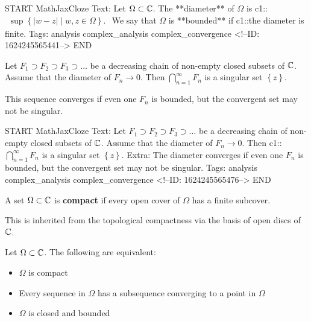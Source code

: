\documentclass{memoir}
\begin{document}
\begin{anki}
START
MathJaxCloze
Text: Let \(\Omega\subset \mathbb{C}\). The **diameter** of \(\Omega\) is
 {{c1::\(\begin{align*}
         	\sup \left\{\left| w-z \right|  \mid w,z \in \Omega \right\} .
         \end{align*}\)}} 
We say that \(\Omega\) is **bounded** if {{c1::the diameter is finite}}.
Tags: analysis complex_analysis complex_convergence
<!--ID: 1624245565441-->
END
\end{anki}

\begin{thm}
	Let \(F_1 \supset F_2 \supset F_3 \supset \ldots\) be a decreasing chain of non-empty closed subsets of \(\mathbb{C}\). Assume that the diameter of \(F_n\to 0\). Then \(\bigcap_{n=1}^{\infty}F_n\) is a singular set \(\left\{ z \right\} \).
\end{thm}
This sequence converges if even one \(F_n\) is bounded, but the convergent set may not be singular.

\begin{anki}
START
MathJaxCloze
Text: Let \(F_1 \supset F_2 \supset F_3 \supset \ldots\) be a decreasing chain of non-empty closed subsets of \(\mathbb{C}\). Assume that the diameter of \(F_n\to 0\). Then {{c1::\(\bigcap_{n=1}^{\infty}F_n\) is a singular set \(\left\{ z \right\} \)}}.
Extra: The diameter converges if even one \(F_n\) is bounded, but the convergent set may not be singular.
Tags: analysis complex_analysis complex_convergence
<!--ID: 1624245565476-->
END
\end{anki}

\begin{defn}[Compactness]
	A set \(\Omega\subset \mathbb{C}\) is \textbf{compact} if every open cover of \(\Omega\) has a finite subcover.
\end{defn}

This is inherited from the topological compactness via the basis of open discs of \(\mathbb{C}\).

\begin{thm}
	Let \(\Omega \subset \mathbb{C}\). The following are equivalent:
	\begin{itemize}
		\item \(\Omega\) is compact
		\item Every sequence in \(\Omega\) has a subsequence converging to a point in \(\Omega\)
		\item \(\Omega\) is closed and bounded
	\end{itemize}
\end{thm}
\end{document}
